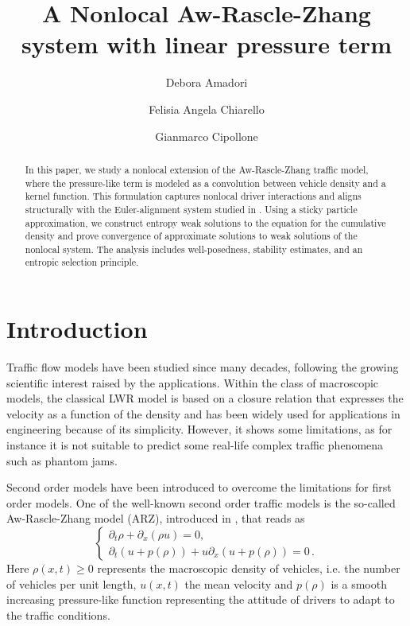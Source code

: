 \documentclass[11pt,a4paper,oneside]{amsart}
\title{A Nonlocal Aw-Rascle-Zhang system with linear pressure term}
\author{Debora Amadori}
\author{Felisia Angela Chiarello}
\author{Gianmarco Cipollone}
\begin{document}
\begin{abstract}
In this paper, we study a nonlocal extension of the Aw-Rascle-Zhang traffic model, where the pressure-like term 
is modeled as a convolution between vehicle density and a kernel function. This formulation captures nonlocal driver
interactions and aligns structurally with the Euler-alignment system studied in \cite{Leslie-Tan}. 
Using a sticky particle approximation, we construct entropy weak solutions to the equation for the cumulative density and prove convergence of approximate solutions
to weak solutions of the nonlocal system. The analysis includes well-posedness, stability estimates, and an entropic selection principle.
\end{abstract}



\maketitle


\section{Introduction}
\setcounter{equation}{0}
Traffic flow models have been studied since many decades, following the growing scientific interest raised by the applications.
Within the class of macroscopic models, the classical LWR model \cite{LighthillWhitham, Richards} is based on a closure relation 
that expresses the velocity as a function of the density and has been widely used for applications in engineering because of its simplicity. 
However, it shows some limitations, as for instance it is not suitable to predict some real-life complex traffic phenomena such as phantom jams. 

Second order models have been introduced to overcome the limitations for first order models. One of the well-known second order traffic models 
is the so-called Aw-Rascle-Zhang model (ARZ), introduced in \cite{AR00,Zhang2002}, that reads as
\begin{equation}\label{eq:ARZ-local}
   \begin{cases}
        \partial_t\rho+\partial_x(\rho u)=0,\\
        \partial_t (u+ p(\rho)) +u\partial_x(u+p(\rho))=0\,.
    \end{cases}
\end{equation}
Here $\rho(x,t)\ge 0$ represents the macroscopic density of vehicles, i.e. the number of vehicles per unit length, 
$u(x,t)$ the mean velocity and $p(\rho)$ is a smooth increasing pressure-like function %
representing the attitude of drivers to adapt to the traffic conditions.
\end{document}
